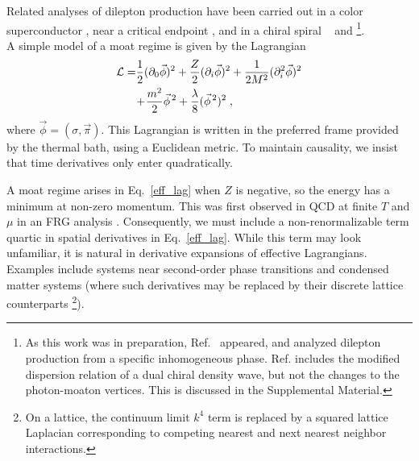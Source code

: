 \documentclass[twocolumn,prd,superscriptaddress, colorlinks, linkcolor=refcol, citecolor=refcol, urlcolor=refcol]{revtex4-2}
\begin{document}
Related analyses of dilepton production have been carried out
in a color superconductor \cite{Nishimura:2022mku}, 
near a critical endpoint \cite{Nishimura:2023oqn,Nishimura:2024kvz}, and in a chiral spiral
~\cite{Hayashi:2024sae}
and 
\footnote{
As this work was in preparation, Ref.~\cite{Hayashi:2024sae} appeared, and analyzed
dilepton production from a specific inhomogeneous phase.
Ref. \cite{Hayashi:2024sae} includes the modified dispersion relation
of a dual chiral density wave, but not the changes to the photon-moaton
vertices.  This is discussed
in the Supplemental Material.
}.
\\

A simple model of a moat regime is given by the Lagrangian \cite{Pisarski:2018bct,Pisarski:2020dnx}
\begin{align}\label{eff_lag}  
  {\cal L} = &\frac{1}{2} (\partial_0 \vec{\phi})^2 
  + \frac{Z}{2} (\partial_i \vec{\phi})^2 
   + \frac{1}{2 M^2}(\partial_i^2 \vec{\phi})^2 \nonumber\\
   &\!+\! \frac{m^2}{2} \vec{\phi}^{\, 2}+ \frac{\lambda}{8}
   (\vec{\phi}^{\,2})^2 \; ,
\end{align}
%
where $\vec{\phi}=(\sigma,\vec{\pi})$.
This Lagrangian is written in the preferred frame provided by the thermal bath, using a Euclidean metric.  To maintain
causality, we insist that time derivatives only enter quadratically.

A moat regime arises in Eq.~\eqref{eff_lag}
when $Z$ is negative, so the energy has a minimum at non-zero momentum. This was first observed in QCD at finite $T$ and $\mu$ in an FRG analysis \cite{Fu:2019hdw}.
Consequently, we must include a non-renormalizable term
quartic in spatial derivatives in Eq.~\eqref{eff_lag}.
While this term may look unfamiliar,
it is
natural in derivative expansions of effective Lagrangians. 
Examples include systems near second-order phase transitions \cite{Balog:2019rrg} and 
condensed matter systems  \cite{Yoshimori,Hornnerich,Seul,modulation1,modulation2}
(where such derivatives may
be replaced by their discrete lattice counterparts \footnote{On a lattice, the continuum limit $k^4$ term is replaced by a squared lattice Laplacian corresponding to competing nearest and next nearest neighbor interactions.}).
\end{document}
